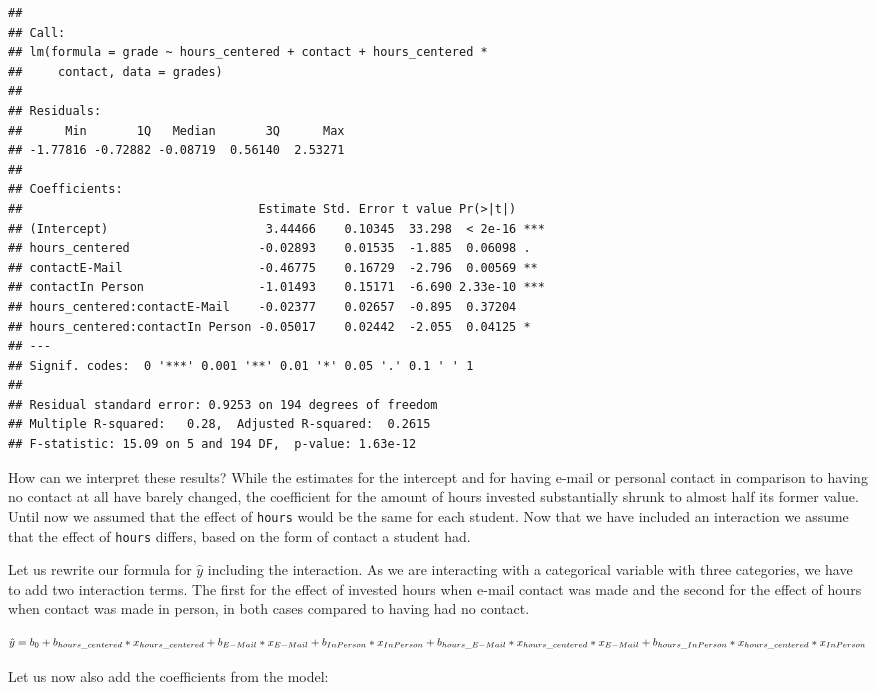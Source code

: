 \documentclass[
]{book}
\begin{document}
\begin{verbatim}
## 
## Call:
## lm(formula = grade ~ hours_centered + contact + hours_centered * 
##     contact, data = grades)
## 
## Residuals:
##      Min       1Q   Median       3Q      Max 
## -1.77816 -0.72882 -0.08719  0.56140  2.53271 
## 
## Coefficients:
##                                 Estimate Std. Error t value Pr(>|t|)    
## (Intercept)                      3.44466    0.10345  33.298  < 2e-16 ***
## hours_centered                  -0.02893    0.01535  -1.885  0.06098 .  
## contactE-Mail                   -0.46775    0.16729  -2.796  0.00569 ** 
## contactIn Person                -1.01493    0.15171  -6.690 2.33e-10 ***
## hours_centered:contactE-Mail    -0.02377    0.02657  -0.895  0.37204    
## hours_centered:contactIn Person -0.05017    0.02442  -2.055  0.04125 *  
## ---
## Signif. codes:  0 '***' 0.001 '**' 0.01 '*' 0.05 '.' 0.1 ' ' 1
## 
## Residual standard error: 0.9253 on 194 degrees of freedom
## Multiple R-squared:   0.28,  Adjusted R-squared:  0.2615 
## F-statistic: 15.09 on 5 and 194 DF,  p-value: 1.63e-12
\end{verbatim}

How can we interpret these results? While the estimates for the intercept and for having e-mail or personal contact in comparison to having no contact at all have barely changed, the coefficient for the amount of hours invested substantially shrunk to almost half its former value. Until now we assumed that the effect of \texttt{hours} would be the same for each student. Now that we have included an interaction we assume that the effect of \texttt{hours} differs, based on the form of contact a student had.

Let us rewrite our formula for \(\hat{y}\) including the interaction. As we are interacting with a categorical variable with three categories, we have to add two interaction terms. The first for the effect of invested hours when e-mail contact was made and the second for the effect of hours when contact was made in person, in both cases compared to having had no contact.

\[\hat{y} = b_0 + b_{hours\_centered} * x_{hours\_centered} +\\
b_{E-Mail} * x_{E-Mail} + b_{In Person} * x_{In Person} +\\
b_{hours\_E-Mail} * x_{hours\_centered} * x_{E-Mail} +\\
b_{hours\_{In Person}} * x_{hours\_centered} * x_{In Person}\]

Let us now also add the coefficients from the model:
\end{document}
